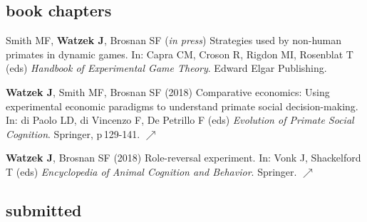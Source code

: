 \documentclass[]{friggeri-cv}
\begin{document}

\subsection{book chapters}

\begin{enumerate}[resume, label={[\,\arabic*\,]}]
  \item Smith MF, \textbf{Watzek J}, Brosnan SF (\emph{in press}) Strategies used by non-human primates in dynamic games. In: Capra CM, Croson R, Rigdon MI, Rosenblat T (eds) \emph{Handbook of Experimental Game Theory}. Edward Elgar Publishing.
  \item \textbf{Watzek J}, Smith MF, Brosnan SF (2018) Comparative economics: Using experimental economic paradigms to understand primate social decision-making. In: di Paolo LD, di Vincenzo F, De Petrillo F (eds) \emph{Evolution of Primate Social Cognition}. Springer, p\,129-141. \href{https://doi.org/10.1007/978-3-319-93776-2_9}{\small $\nearrow$}
  \item \textbf{Watzek J}, Brosnan SF (2018) Role-reversal experiment. In: Vonk J, Shackelford T (eds) \emph{Encyclopedia of Animal Cognition and Behavior}. Springer. \href{https://doi.org/10.1007/978-3-319-47829-6_1497-1}{\small $\nearrow$}
\end{enumerate}


\newpage


\subsection{submitted}
\end{document}
